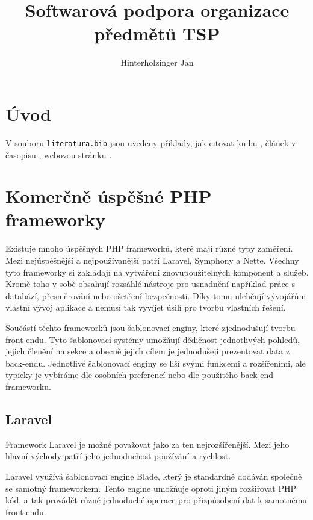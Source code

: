 \documentclass[czech,BP]{thesiskiv}
\author{Hinterholzinger Jan}
\title{Softwarová podpora organizace předmětů TSP}
\begin{document}
%
\maketitle
\tableofcontents

\chapter{Úvod}
V souboru \texttt{literatura.bib} jsou uvedeny příklady, jak citovat knihu \cite{KnuthAOCP2}, článek v časopisu \cite{Hoare1961}, webovou stránku \cite{Graphics2D}.
 
\chapter{Komerčně úspěšné PHP frameworky}
\par Existuje mnoho úspěšných PHP frameworků, které mají různé typy zaměření. Mezi nejúspěšnější a nejpoužívanější patří Laravel, Symphony a Nette. Všechny tyto frameworky si zakládají na vytváření znovupoužitelných komponent a služeb. Kromě toho v sobě obsahují rozsáhlé nástroje pro usnadnění například práce s databází, přesměrování nebo ošetření bezpečnosti. Díky tomu ulehčují vývojářům vlastní vývoj aplikace a nemusí tak vyvíjet úsilí pro tvorbu vlastních řešení.
\par Součástí těchto frameworků jsou šablonovací enginy, které zjednodušují tvorbu front-endu. Tyto šablonovací systémy umožňují dědičnost jednotlivých pohledů, jejich členění na sekce a obecně jejich cílem je jednodušeji prezentovat data z back-endu. Jednotlivé šablonovací enginy se liší svými funkcemi a rozšířeními, ale typicky je vybíráme dle osobních preferencí nebo dle použitého back-end frameworku.
\section{Laravel}
\par Framework Laravel je možné považovat jako za ten nejrozšířenější. Mezi jeho hlavní východy patří jeho jednoduchost používání a rychlost.
\par Laravel využívá šablonovací engine Blade, který je standardně dodáván společně se samotný frameworkem. Tento engine umožňuje oproti jiným rozšiřovat PHP kód, a tak provádět různé jednoduché operace pro přizpůsobení dat k samotnému front-endu.
\end{document}
